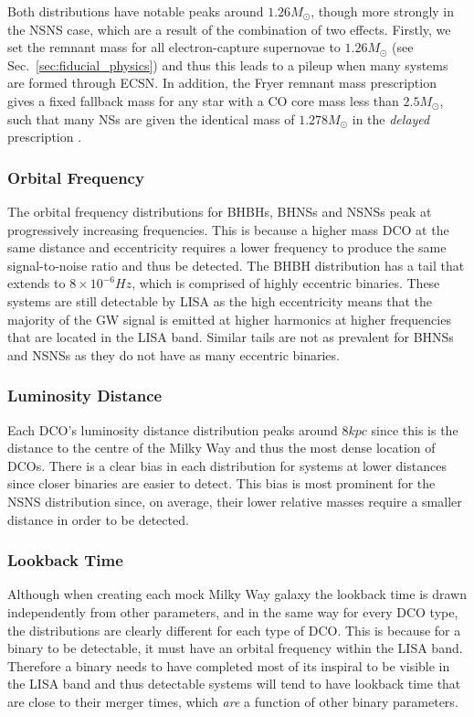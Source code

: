 Both distributions have notable peaks around $1.26 \unit{M_{\odot}}$, though more strongly in the NSNS case, which are a result of the combination of two effects. Firstly, we set the remnant mass for all electron-capture supernovae to $1.26 \unit{M_\odot}$ (see Sec.~\ref{sec:fiducial_physics}) and thus this leads to a pileup when many systems are formed through ECSN. In addition, the Fryer remnant mass prescription gives a fixed fallback mass for any star with a CO core mass less than $2.5 \unit{M_\odot}$, such that many NSs are given the identical mass of $1.278 \unit{M_\odot}$ in the \textit{delayed} prescription \citep[see][Eq.~19]{Fryer+2012}. 

\subsubsection{Orbital Frequency}
The orbital frequency distributions for BHBHs, BHNSs and NSNSs peak at progressively increasing frequencies. This is because a higher mass DCO at the same distance and eccentricity requires a lower frequency to produce the same signal-to-noise ratio and thus be detected. The BHBH distribution has a tail that extends to $8 \times 10^{-6} \unit{Hz}$, which is comprised of highly eccentric binaries. These systems are still detectable by LISA as the high eccentricity means that the majority of the GW signal is emitted at higher harmonics at higher frequencies that are located in the LISA band. Similar tails are not as prevalent for BHNSs and NSNSs as they do not have as many eccentric binaries.

\subsubsection{Luminosity Distance}
Each DCO's luminosity distance distribution peaks around $8 \unit{kpc}$ since this is the distance to the centre of the Milky Way and thus the most dense location of DCOs. There is a clear bias in each distribution for systems at lower distances since closer binaries are easier to detect. This bias is most prominent for the NSNS distribution since, on average, their lower relative masses require a smaller distance in order to be detected.

\subsubsection{Lookback Time}
Although when creating each mock Milky Way galaxy the lookback time is drawn independently from other parameters, and in the same way for every DCO type, the distributions are clearly different for each type of DCO. This is because for a binary to be detectable, it must have an orbital frequency within the LISA band. Therefore a binary needs to have completed most of its inspiral to be visible in the LISA band and thus detectable systems will tend to have lookback time that are close to their merger times, which \textit{are} a function of other binary parameters.

